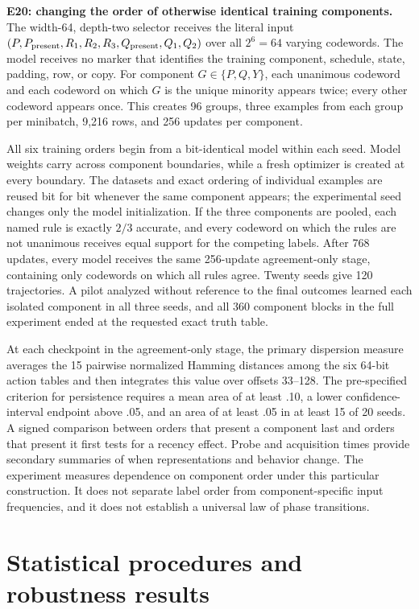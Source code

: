 \textbf{E20: changing the order of otherwise identical training components.} The width-64, depth-two selector receives the literal input $(P,P_{\rm present},R_1,R_2,R_3,Q_{\rm present},Q_1,Q_2)$ over all $2^6=64$ varying codewords. The model receives no marker that identifies the training component, schedule, state, padding, row, or copy. For component $G\in\{P,Q,Y\}$, each unanimous codeword and each codeword on which $G$ is the unique minority appears twice; every other codeword appears once. This creates 96 groups, three examples from each group per minibatch, 9,216 rows, and 256 updates per component.

All six training orders begin from a bit-identical model within each seed. Model weights carry across component boundaries, while a fresh optimizer is created at every boundary. The datasets and exact ordering of individual examples are reused bit for bit whenever the same component appears; the experimental seed changes only the model initialization. If the three components are pooled, each named rule is exactly $2/3$ accurate, and every codeword on which the rules are not unanimous receives equal support for the competing labels. After 768 updates, every model receives the same 256-update agreement-only stage, containing only codewords on which all rules agree. Twenty seeds give 120 trajectories. A pilot analyzed without reference to the final outcomes learned each isolated component in all three seeds, and all 360 component blocks in the full experiment ended at the requested exact truth table.

At each checkpoint in the agreement-only stage, the primary dispersion measure averages the 15 pairwise normalized Hamming distances among the six 64-bit action tables and then integrates this value over offsets 33--128. The pre-specified criterion for persistence requires a mean area of at least .10, a lower confidence-interval endpoint above .05, and an area of at least .05 in at least 15 of 20 seeds. A signed comparison between orders that present a component last and orders that present it first tests for a recency effect. Probe and acquisition times provide secondary summaries of when representations and behavior change. The experiment measures dependence on component order under this particular construction. It does not separate label order from component-specific input frequencies, and it does not establish a universal law of phase transitions.

\section{Statistical procedures and robustness results}

